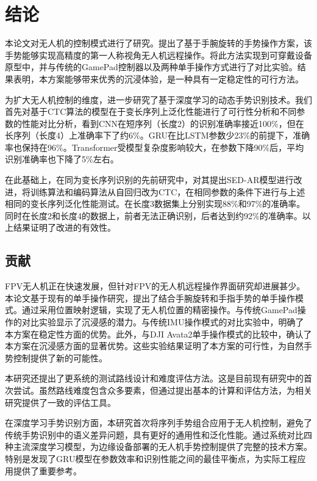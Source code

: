 \ifx\allfiles\undefined


\else
\fi

\section{结论}
本论文对无人机的控制模式进行了研究。提出了基于手腕旋转的手势操作方案，该手势能够实现高精度的第一人称视角无人机远程操作。将此方法实现到可穿戴设备原型中，并与传统的GamePad控制器以及两种单手操作方式进行了对比实验。结果表明，本方案能够带来优秀的沉浸体验，是一种具有一定稳定性的可行方法。

为扩大无人机控制的维度，进一步研究了基于深度学习的动态手势识别技术。我们首先对基于CTC算法的模型在于变长序列上泛化性能进行了可行性分析和不同参数的性能对比分析，看到CNN在短序列（长度2）的识别准确率接近100\%，但在长序列（长度4）上准确率下了约6\%。GRU在比LSTM参数少23\%的前提下，准确率也保持在96\%。Transformer受模型复杂度影响较大，在参数下降90\%后，平均识别准确率也下降了5\%左右。

在此基础上，在同为变长序列识别的先前研究中，对其提出SED-AR模型进行改进，将训练算法和编码算法从自回归改为CTC，在相同参数的条件下进行与上述相同的变长序列泛化性能测试。在长度3数据集上分别实现88\%和97\%的准确率。同时在长度2和长度4的数据上，前者无法正确识别，后者达到约92\%的准确率。以上结果证明了改进的有效性。

\subsection{贡献}

FPV无人机正在快速发展，但针对FPV的无人机远程操作界面研究却进展甚少。本论文基于现有的单手操作研究，提出了结合手腕旋转和手指手势的单手操作模式。通过采用位置映射逻辑，实现了无人机位置的精密操作。与传统GamePad操作的对比实验显示了沉浸感的潜力。与传统IMU操作模式的对比实验中，明确了本方案在稳定性方面的优势。此外，与DJI Avata2单手操作模式的比较中，确认了本方案在沉浸感方面的显著优势。这些实验结果证明了本方案的可行性，为自然手势控制提供了新的可能性。

本研究还提出了更系统的测试路线设计和难度评估方法。这是目前现有研究中的首次尝试。虽然路线难度包含众多要素，但通过提出基本的计算和评估方法，为相关研究提供了一致的评估工具。

在深度学习手势识别方面，本研究首次将序列手势组合应用于无人机控制，避免了传统手势识别中的语义差异问题，具有更好的通用性和泛化性能。通过系统对比四种主流深度学习模型，为边缘设备部署的无人机手势控制提供了完整的技术方案。特别是发现了GRU模型在参数效率和识别性能之间的最佳平衡点，为实际工程应用提供了重要参考。

